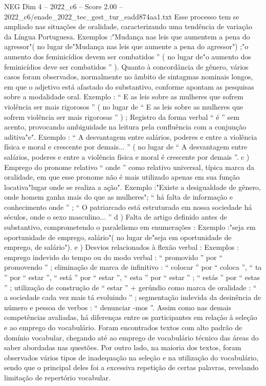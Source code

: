 \begin{textsample}{NEG Dim 4 – 2022\_c6 – Score 2.00 – 2022\_c6/enade\_2022\_tec\_gest\_tur\_eadd874aa1.txt}
Esse processo tem se ampliado nas situações de oralidade, caracterizando uma tendência de variação da Língua Portuguesa.
Exemplos :"Mudança nas leis que aumentem a pena do agressor"( no lugar de"Mudança nas leis que aumente a pena do agressor") ;"o aumento dos feminicídios devem ser combatidos ” ( no lugar de"o aumento dos feminicídios deve ser combatidos ” ).
Quanto à concordância de gênero, vários casos foram observados, normalmente no âmbito de sintagmas nominais longos, em que o adjetivo está afastado do substantivo, conforme apontam as pesquisas sobre a modalidade oral.
Exemplo : “ E as leis sobre as mulheres que sofrem violência ser mais rigorosos ” ( no lugar de “ E as leis sobre as mulheres que sofrem violência ser mais rigorosas ” ) ; Registro da forma verbal “ é ” sem acento, provocando ambiguidade na leitura pela confluência com a conjunção aditiva"e".
Exemplo : “ A desvantagem entre salários, poderes e entre a violência física e moral e crescente por demais... ” ( no lugar de “ A desvantagem entre salários, poderes e entre a violência física e moral é crescente por demais ”. c ) Emprego do pronome relativo “ onde ” como relativo universal, típica marca da oralidade, em que esse pronome não é mais utilizado apenas em sua função locativa"lugar onde se realiza a ação".
Exemplo :"Existe a desigualdade de gênero, onde homem ganha mais do que as mulheres"; “ há falta de informação e conhecimento onde ” ; “ O patriarcado está estruturado em nossa sociedade há séculos, onde o sexo masculino... ” d ) Falta de artigo definido antes de substantivo, comprometendo o paralelismo em enumerações : Exemplo :"seja em oportunidade de emprego, salário"( no lugar de"seja em oportunidade de emprego, de salário"). e ) Desvios relacionados à flexão verbal : Exemplos : emprego indevido do tempo ou do modo verbal : “ promovido ” por “ promovendo ” ; eliminação de marca de infinitivo : “ colocar ” por “ coloca ”, “ ta ” por “ estar ”, “ está ” por “ estar ”, “ esta ” por “ estar ” ; “ estás ” por “ estas ” ; utilização de construção de “ estar ” + gerúndio como marca de oralidade : “ a sociedade cada vez mais tá evoluindo ” ; segmentação indevida da desinência de número e pessoa de verbos : “ denunciar -mos ”.
Assim como nas demais competências avaliadas, há diferenças entre os participantes em relação à seleção e ao emprego do vocabulário.
Foram encontrados textos com alto padrão de domínio vocabular, chegando até ao emprego de vocabulário técnico das áreas do saber abordadas nas questões.
Por outro lado, na maioria dos textos, foram observados vários tipos de inadequação na seleção e na utilização do vocabulário, sendo que o principal deles foi a excessiva repetição de certas palavras, revelando limitação de repertório vocabular.

\end{textsample}
